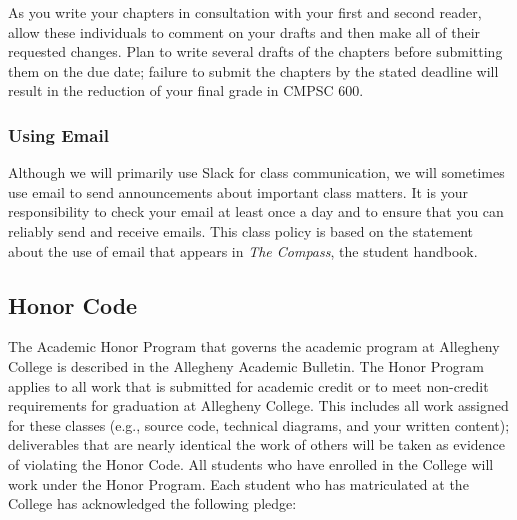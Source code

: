 \documentclass[11pt]{article}
\begin{document}
As you write your chapters in consultation with your first and second reader, allow these individuals to comment on your
drafts and then make all of their requested changes.  Plan to write several drafts of the chapters before submitting them
on the due date; failure to submit the chapters by the stated deadline will result in the reduction of your final grade
in CMPSC 600.



\subsubsection*{Using Email}

Although we will primarily use Slack for class communication, we will sometimes use email to send announcements about
important class matters. It is your responsibility to check your email at least once a day and to ensure that you can
reliably send and receive emails. This class policy is based on the statement about the use of email that appears in
{\em The Compass}, the student handbook.

\subsection*{Honor Code}

The Academic Honor Program that governs the academic program at Allegheny College is described in the Allegheny
Academic Bulletin.  The Honor Program applies to all work that is submitted for academic credit or to meet non-credit
requirements for graduation at Allegheny College.  This includes all work assigned for these classes (e.g., source code,
technical diagrams, and your written content); deliverables that are nearly identical the work of others will be taken
as evidence of violating the Honor Code. All students who have enrolled in the College will work under the Honor
Program.  Each student who has matriculated at the College has acknowledged the following pledge:
\end{document}
